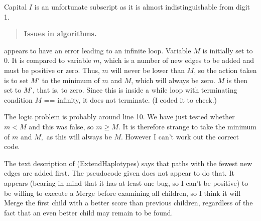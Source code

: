 
\begin{point}{}
Capital $I$ is an unfortunate subscript as it is almost indistinguishable
from digit 1.
\end{point}


\begin{quote} %
\textbf{Issues in algorithms.}
\end{quote}

\begin{point}{}
 appears to have an error leading to an infinite
loop. Variable $M$ is initially set to 0. It is compared to variable $m$,
which is a number of new edges to be added and must be positive or zero.
Thus, $m$ will never be lower than $M$, so the action taken is to set $M'$ to
the minimum of $m$ and $M$, which will always be zero. $M$ is then set to
$M'$, that is, to zero. Since this is inside a while loop with terminating
condition $M$ == infinity, it does not terminate. (I coded it to check.)

The logic problem is probably around line 10. We have just tested
whether $m < M$ and this was false, so $m \ge M$. It is therefore
strange to take the minimum of $m$ and $M,$ as this will always be
$M$. However I can't work out the correct code.
\end{point}


\begin{point}{}
The text description of  (ExtendHaplotypes) says that
paths with the fewest new edges are added first. The pseudocode
given does not appear to do that. It appears (bearing in mind that
it has at least one bug, so I can't be positive) to be willing to
execute a Merge before examining all children, so I think it will
Merge the first child with a better score than previous children,
regardless of the fact that an even better child may remain to be
found.
\end{point}

